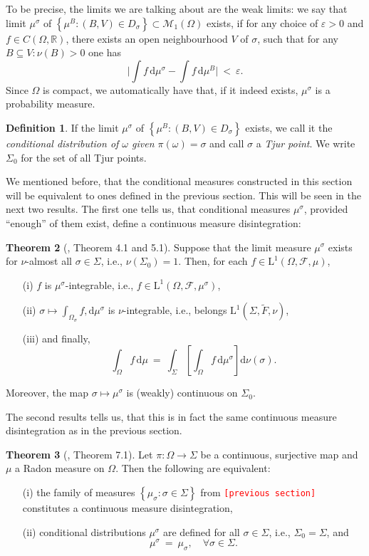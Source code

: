 \documentclass[12pt]{article}
\renewcommand{\d}{\mathrm{d}}
\newcommand{\F}{\mathcal{F}}
\newcommand{\M}{\mathcal{M}}
\newcommand{\R}{\mathbb{R}}
\newcommand{\set}[1]{\left\{#1\right\}}
\newcommand{\oglati}[1]{\left[#1\right]}
\newcommand{\ra}{\rightarrow}
\newcommand{\1}{\mathbbm{1}}
\newcommand{\5}{\vspace{0.5cm}}
\renewcommand{\tilde}{\widetilde}
\theoremstyle{definition}
\newtheorem{thm}{Theorem}[section]
\newtheorem{df}[thm]{Definition}
\begin{document}
To be precise, the limits we are talking about are the weak limits: we say that limit $\mu^\sigma$ of $\set{\mu^B:(B,V)\in D_\sigma}\subset\M_1(\Omega)$ exists, if for any choice of $\varepsilon>0$ and $f\in C(\Omega,\R)$, there exists an open neighbourhood $V$ of $\sigma$, such that for any $B\subseteq V:\nu(B)>0$ one has
$$\Big|\int f\,\d\mu^\sigma-\int f\,\d\mu^B\Big| ~<~ \varepsilon.$$
Since $\Omega$ is compact, we automatically have that, if it indeed exists, $\mu^\sigma$ is a probability measure.

\begin{df} 
If the limit $\mu^\sigma$ of $\set{\mu^B:(B,V)\in D_\sigma}$ exists, we call it the \textit{conditional distribution of $\omega$ given $\pi(\omega)=\sigma$} and call $\sigma$ a \textit{Tjur point}. We write $\Sigma_0$ for the set of all Tjur points.
\end{df}

We mentioned before, that the conditional measures constructed in this section will be equivalent to ones defined in the previous section. This will be seen in the next two results. The first one tells us, that conditional measures $\mu^\sigma$, provided ``enough'' of them exist, define a continuous measure disintegration:

\begin{thm}[\cite{Tju}, Theorem 4.1 and 5.1]
Suppose that the limit measure $\mu^\sigma$ exists for $\nu$-almost all $\sigma\in\Sigma$, i.e., $\nu(\Sigma_0)=1$. Then, for each $f\in\mathrm{L}^1(\Omega,\F,\mu)$,
\begin{itemize}
	\item[(i)] $f$ is $\mu^\sigma$-integrable, i.e., $f\in\mathrm{L}^1(\Omega,\F,\mu^\sigma)$, 
	\item[(ii)] $\sigma\mapsto\int_{\Omega_\sigma}f,\d\mu^\sigma$ is $\nu$-integrable, i.e., belongs $\mathrm{L}^1(\Sigma,\tilde{F},\nu)$, 
	\item[(iii)] and finally,
	$$\int_\Omega f\,\d\mu ~=~ \int_\Sigma\!\oglati{\int_\Omega f\,\d\mu^\sigma}\!\d\nu(\sigma).$$
\end{itemize}
Moreover, the map $\sigma\mapsto\mu^\sigma$ is (weakly) continuous on $\Sigma_0$.
\end{thm}
The second results tells us, that this is in fact the same continuous measure disintegration as in the previous section.
\begin{thm}[\cite{Tju}, Theorem 7.1]
Let $\pi:\Omega\ra\Sigma$ be a continuous, surjective map and $\mu$ a Radon measure on $\Omega$. Then the following are equivalent:
\begin{itemize}
	\item[(i)] the family of measures $\set{\mu_\sigma:\sigma\in\Sigma}$ from \textcolor{red}{\texttt{[previous section]}} constitutes a continuous measure disintegration,
	\item[(ii)] conditional distributions $\mu^\sigma$ are defined for all $\sigma\in\Sigma$, i.e., $\Sigma_0=\Sigma$, and
	$$\mu^\sigma ~=~ \mu_\sigma, \quad \forall \sigma\in\Sigma.$$
\end{itemize}
\end{thm}
\end{document}
